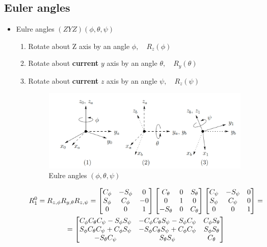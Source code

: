 \documentclass{article}
\begin{document}
\subsection{Euler angles}
\begin{itemize}
    \item Eulre angles $(ZYZ) (\phi, \theta,\psi)$
    \begin{enumerate}
        \item Rotate about Z axis by an angle $\phi, \quad R_z(\phi)$ 
        \item Rotate about \textbf{current} $y$ axis by an angle $\theta,  \quad R_y(\theta)$ 
        \item Rotate about \textbf{current} $z$ axis by an angle $\psi,  \quad R_z(\psi)$
    \begin{figure}[h!]
\includegraphics[scale=1.5]{euler.png}
\caption{Eulre angles $(\phi, \theta,\psi)$}
\label{fig:sr}
\centering
\end{figure}

 \begin{multline*}
    R^{0}_{1} = R_{z,\phi}R_{y,\theta}R_{z,\psi} =
    \begin{bmatrix}
    C_\phi & -S_\phi & 0 \\
    S_\phi & C_\phi & -0 \\
    0 & 0 & 1
    \end{bmatrix}
    \begin{bmatrix}
    C_\theta & 0 & S_\theta \\
    0 & 1 & 0 \\
    -S_\theta & 0 & C_\theta 
    \end{bmatrix}
    \begin{bmatrix}
    C_\psi & -S_\psi &  0 \\
    S_\psi & C_\psi & 0\\
    0 & 0 & 1 \\
    \end{bmatrix} =\\ =
    \linebreak
    \begin{bmatrix}
    C_\phi C_\theta C_\psi - S_\phi S_\psi  & -C_\phi C_\theta S_\psi - S_\phi C_\psi & C_\phi S_\theta \\
    S_\phi C_\theta  C_\psi + C_\phi S_\psi & -S_\phi C_\theta  S_\psi + C_\phi C_\psi & S_\phi S_\theta \\
    -S_\theta C_\psi & S_\theta S_\psi & C_\theta
    \end{bmatrix}
 \end{multline*}


\end{enumerate}
\end{itemize}
\end{document}
